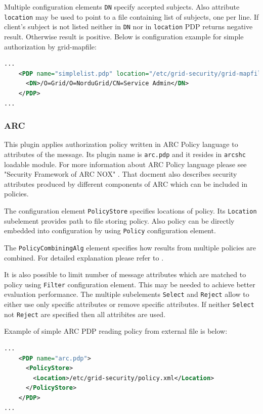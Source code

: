 \documentclass{article}
\begin{document}
Multiple configuration elements \texttt{DN} specify accepted subjects. Also attribute
\texttt{location} may be used to point to a file containing list of subjects, one
per line. If client's subject is not listed neither in \texttt{DN} nor in
\texttt{location} PDP returns negative result. Otherwise result is positive. Below is
configuration example for simple authorization by grid-mapfile:
\begin{lstlisting}[language=xml]
...
    <PDP name="simplelist.pdp" location="/etc/grid-security/grid-mapfile">
      <DN>/O=Grid/O=NorduGrid/CN=Service Admin</DN>
    </PDP>
...
\end{lstlisting}

\subsubsection{ARC}\label{sec:arc-pdp}
This plugin applies authorization policy written in ARC Policy language to attributes
of the message. Its plugin name is \texttt{arc.pdp} and it resides in \texttt{arcshc}
loadable module. For more information about ARC Policy language please see "Security
Framework of ARC NOX" \cite{arc1-sec}. That docment also describes security
attributes produced by different components of ARC which can be included in policies.

The configuration element \texttt{PolicyStore} specifies locations of policy. Its
\texttt{Location} subelement provides path to file storing policy. Also policy can be
directly embedded into configuration by using \texttt{Policy} configuration element.

The \texttt{PolicyCombiningAlg} element specifies how results from multiple policies
are combined. For detailed explanation please refer to \cite{arc1-sec}.

It is also possible to limit number of message attributes which are matched to policy
using \texttt{Filter} configuration element. This may be needed to achieve better
evaluation performance. The multiple subelements \texttt{Select} and \texttt{Reject}
allow to either use only specific attributes or remove specific attributes. If neither
\texttt{Select} not \texttt{Reject} are specified then all attribites are used.

Example of simple ARC PDP reading policy from external file is below:
\begin{lstlisting}[language=xml]
...
    <PDP name="arc.pdp">
      <PolicyStore>
        <Location>/etc/grid-security/policy.xml</Location>
      </PolicyStore>
    </PDP>
...
\end{lstlisting}
\end{document}
